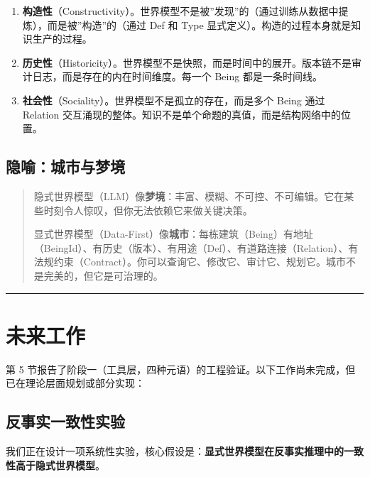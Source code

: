 \documentclass[11pt,a4paper]{ctexart}
\begin{document}
\begin{enumerate}
\def\labelenumi{\arabic{enumi}.}
\item
  \textbf{构造性}（Constructivity）。世界模型不是被''发现''的（通过训练从数据中提炼），而是被''构造''的（通过
  Def 和 Type 显式定义）。构造的过程本身就是知识生产的过程。
\item
  \textbf{历史性}（Historicity）。世界模型不是快照，而是时间中的展开。版本链不是审计日志，而是存在的内在时间维度。每一个
  Being 都是一条时间线。
\item
  \textbf{社会性}（Sociality）。世界模型不是孤立的存在，而是多个 Being
  通过 Relation
  交互涌现的整体。知识不是单个命题的真值，而是结构网络中的位置。
\end{enumerate}

\subsection{隐喻：城市与梦境}\label{ux9690ux55bbux57ceux5e02ux4e0eux68a6ux5883}

\begin{quote}
隐式世界模型（LLM）像\textbf{梦境}：丰富、模糊、不可控、不可编辑。它在某些时刻令人惊叹，但你无法依赖它来做关键决策。

显式世界模型（Data-First）像\textbf{城市}：每栋建筑（Being）有地址（BeingId）、有历史（版本）、有用途（Def）、有道路连接（Relation）、有法规约束（Contract）。你可以查询它、修改它、审计它、规划它。城市不是完美的，但它是可治理的。
\end{quote}

\begin{center}\rule{0.5\linewidth}{0.5pt}\end{center}

\section{未来工作}\label{ux672aux6765ux5de5ux4f5c}

第 5
节报告了阶段一（工具层，四种元语）的工程验证。以下工作尚未完成，但已在理论层面规划或部分实现：

\subsection{反事实一致性实验}\label{ux53cdux4e8bux5b9eux4e00ux81f4ux6027ux5b9eux9a8c}

我们正在设计一项系统性实验，核心假设是：\textbf{显式世界模型在反事实推理中的一致性高于隐式世界模型}。
\end{document}

